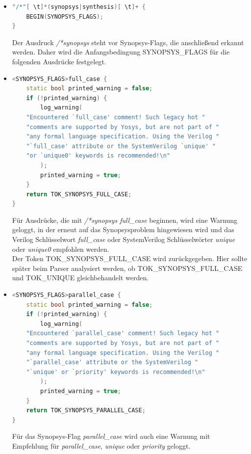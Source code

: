 \documentclass[11pt]{report}
\begin{document}
\begin{itemize}
\begin{lstlisting}[language=C++]
"translate_on"[ \t]*"*/" { BEGIN(0); }
\end{lstlisting}
Diese Regeln erfüllen die Anfangsbedingung SYNOPSYS\_TRANSLATE\_OFF.
Die erste Regel erkennt ein nachfolgendes Zeichen außer einen Zeilenumbruch, der synopsys translate\_off body wird mangels folgendem C++-Code ignoriert.
Das gleiche passiert in der zweiten Regel für einen Zeilenumbruch.\\
Die letzte Regel erkennt beispielsweise den Ausdruck \textit{/*synopsys translate\_on*/}, mit dem der translate\_off body zu ende ist. Damit wird die Anfangsbedingung SYNOPSYS\_TRANSLATE\_OFF mit BEGIN(0) überschrieben und beendet.
\item
\begin{lstlisting}[language=C++]
"/*"[ \t]*(synopsys|synthesis)[ \t]+ {
	BEGIN(SYNOPSYS_FLAGS);
}
\end{lstlisting}
Der Ausdruck \textit{/*synopsys } steht vor Synopsys-Flags, die anschließend erkannt werden. Daher wird die Anfangsbedingung SYNOPSYS\_FLAGS für die folgenden Ausdrücke festgelegt.
\item
\begin{lstlisting}[language=C++]
<SYNOPSYS_FLAGS>full_case {
	static bool printed_warning = false;
	if (!printed_warning) {
		log_warning(
	"Encountered `full_case' comment! Such legacy hot "
	"comments are supported by Yosys, but are not part of "
	"any formal language specification. Using the Verilog "
	"`full_case' attribute or the SystemVerilog `unique' "
	"or `unique0' keywords is recommended!\n"
		);
		printed_warning = true;
	}
	return TOK_SYNOPSYS_FULL_CASE;
}
\end{lstlisting}
Für Ausdrücke, die mit \textit{/*synopsys		full\_case} beginnen, wird eine Warnung geloggt, in der erneut auf das Synopsysproblem hingewiesen wird und das Verilog Schlüsselwort \textit{full\_case} oder SystemVerilog Schlüsselwörter \textit{unique} oder \textit{unique0} empfohlen werden. \\
Der Token TOK\_SYNOPSYS\_FULL\_CASE wird zurückgegeben. Hier sollte später beim Parser analysiert werden, ob TOK\_SYNOPSYS\_FULL\_CASE und TOK\_UNIQUE gleichbehandelt werden.

\item
\begin{lstlisting}[language=C++]
<SYNOPSYS_FLAGS>parallel_case {
	static bool printed_warning = false;
	if (!printed_warning) {
		log_warning(
	"Encountered `parallel_case' comment! Such legacy hot "
	"comments are supported by Yosys, but are not part of "
	"any formal language specification. Using the Verilog "
	"`parallel_case' attribute or the SystemVerilog "
	"`unique' or `priority' keywords is recommended!\n"
		);
		printed_warning = true;
	}
	return TOK_SYNOPSYS_PARALLEL_CASE;
}
\end{lstlisting}
Für das Synopsys-Flag \textit{parallel\_case} wird auch eine Warnung mit Empfehlung für \textit{parallel\_case}, \textit{unique} oder \textit{priority} geloggt.


\end{itemize}
\end{document}
